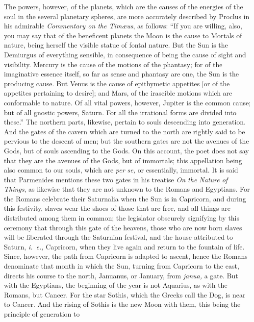 \documentclass[a4paper,12pt]{article}
\begin{document}
{The powers, however, of the planets, which are the causes of the energies of
the soul in the several planetary spheres, are more accurately described by
Proclus in his admirable \textit{Commentary on the Tim{\ae}us}, as follows:
``If you are willing, also, you may say that of the beneficent planets the Moon
is the cause to Mortals of nature, being herself the visible statue of fontal
nature. But the Sun is the Demiurgus of everything sensible, in consequence of
being the cause of sight and visibility. Mercury is the cause of the motions of
the phantasy; for of the imaginative essence itself, so far as sense and
phantasy are one, the Sun is the producing cause. But Venus is the cause of
epithymetic appetites [or of the appetites pertaining to desire]; and Mars, of
the irascible motions which are conformable to nature. Of all vital powers,
however, Jupiter is the common cause; but of all gnostic powers, Saturn. For
all the irrational forms are divided into these.''} The northern parts,
likewise, pertain to souls descending into generation. And the gates of the
cavern which are turned to the north are rightly said to be pervious to the
descent of men; but the southern gates are not the avenues of the Gods, but of
souls ascending to the Gods. On this account, the poet does not say that they
are the avenues of the Gods, but of immortals; this appellation being also
common to our souls, which are \textit{per se,} or essentially, immortal. It is
said that Parmenides mentions these two gates in his treatise \textit{On the
Nature of Things}, as likewise that they are not unknown to the Romans and
Egyptians. For the Romans celebrate their Saturnalia when the Sun is in
Capricorn, and during this festivity, slaves wear the shoes of those that are
free, and all things are distributed among them in common; the legislator
obscurely signifying by this ceremony that through this gate of the heavens,
those who are now born slaves will be liberated through the Saturnian festival,
and the house attributed to Saturn, \textit{i.~e.,} Capricorn, when they live
again and return to the fountain of life. Since, however, the path from
Capricorn is adapted to ascent, hence the Romans denominate that month in which
the Sun, turning from Capricorn to the east, directs his course to the north,
Januanus, or January, from \textit{janua,} a gate. But with the Egyptians, the
beginning of the year is not Aquarius, as with the Romans, but Cancer. For the
star Sothis, which the Greeks call the Dog, is near to Cancer. And the rising
of Sothis is the new Moon with them, this being the principle of generation to
\end{document}
